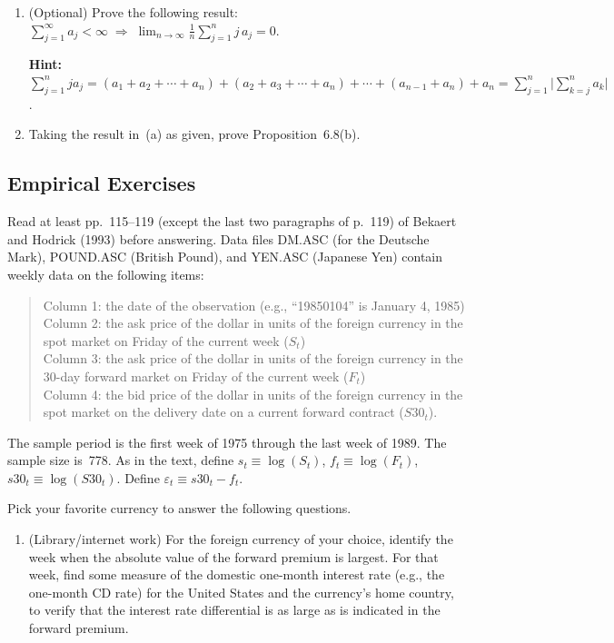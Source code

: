 \begin{problemset}
\begin{enumerate}[label=(\alph*)]
\item (Optional) \; Prove the following result:
$\sum_{j=1}^{\infty} a_j < \infty \;\Rightarrow\; \lim_{n \to \infty} \frac{1}{n}\sum_{j=1}^{n} j\,a_j = 0$.

\textbf{Hint:}
$\sum_{j=1}^{n} j a_j = (a_1 + a_2 + \cdots + a_n) + (a_2 + a_3 + \cdots + a_n) + \cdots + (a_{n-1} + a_n) + a_n
= \sum_{j=1}^{n}\Big|\sum_{k=j}^{n} a_k\Big|$.

\item Taking the result in~(a) as given, prove Proposition~6.8(b).
\end{enumerate}

\subsection*{Empirical Exercises}

\exercise[1] Read at least pp.~115--119 (except the last two paragraphs of p.~119) of Bekaert
and Hodrick (1993) before answering. Data files DM.ASC (for the Deutsche
Mark), POUND.ASC (British Pound), and YEN.ASC (Japanese Yen) contain
weekly data on the following items:

\begin{quote}
Column 1: the date of the observation (e.g., ``19850104'' is January 4, 1985) \\
Column 2: the ask price of the dollar in units of the foreign currency in the
spot market on Friday of the current week ($S_t$) \\
Column 3: the ask price of the dollar in units of the foreign currency in the
30-day forward market on Friday of the current week ($F_t$) \\
Column 4: the bid price of the dollar in units of the foreign currency in the spot
market on the delivery date on a current forward contract ($S30_t$).
\end{quote}

The sample period is the first week of 1975 through the last week of 1989.
The sample size is~778. As in the text, define $s_t \equiv \log(S_t)$, $f_t \equiv \log(F_t)$,
$s30_t \equiv \log(S30_t)$. Define $\varepsilon_t \equiv s30_t - f_t$.

Pick your favorite currency to answer the following questions.

\begin{enumerate}[label=(\alph*)]
\item (Library/internet work) \; For the foreign currency of your choice, identify
the week when the absolute value of the forward premium is largest. For
that week, find some measure of the domestic one-month interest rate (e.g.,
the one-month CD rate) for the United States and the currency's home
country, to verify that the interest rate differential is as large as is indicated
in the forward premium.


\end{enumerate}
\end{problemset}
